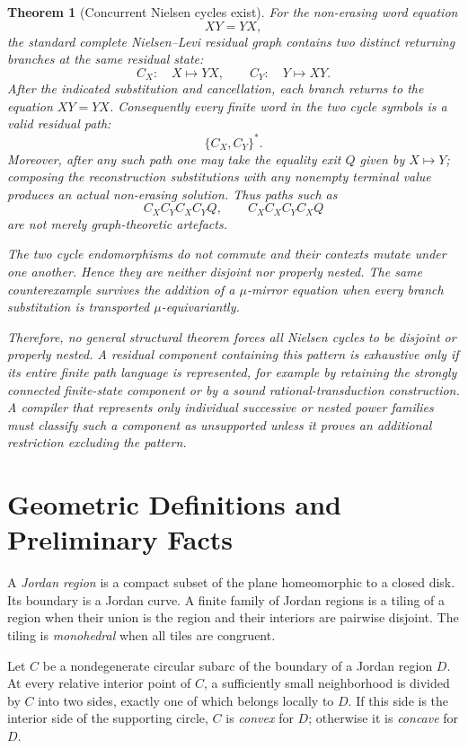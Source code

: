 \documentclass[11pt]{article}
\newtheorem{theorem}{Theorem}[section]
\begin{document}
\begin{theorem}[Concurrent Nielsen cycles exist]\label{thm:concurrent}
For the non-erasing word equation
\[
  XY=YX,
\]
the standard complete Nielsen--Levi residual graph contains two distinct returning branches at the same residual state:
\[
  C_X:\quad X\mapsto YX,
  \qquad
  C_Y:\quad Y\mapsto XY.
\]
After the indicated substitution and cancellation, each branch returns to the equation $XY=YX$. Consequently every finite word in the two cycle symbols is a valid residual path:
\[
  \{C_X,C_Y\}^*.
\]
Moreover, after any such path one may take the equality exit $Q$ given by $X\mapsto Y$; composing the reconstruction substitutions with any nonempty terminal value produces an actual non-erasing solution. Thus paths such as
\[
  C_XC_YC_XC_YQ,
  \qquad
  C_XC_XC_YC_XQ
\]
are not merely graph-theoretic artefacts.

The two cycle endomorphisms do not commute and their contexts mutate under one another. Hence they are neither disjoint nor properly nested. The same counterexample survives the addition of a $\mu$-mirror equation when every branch substitution is transported $\mu$-equivariantly.

Therefore, no general structural theorem forces all Nielsen cycles to be disjoint or properly nested. A residual component containing this pattern is exhaustive only if its entire finite path language is represented, for example by retaining the strongly connected finite-state component or by a sound rational-transduction construction. A compiler that represents only individual successive or nested power families must classify such a component as unsupported unless it proves an additional restriction excluding the pattern.
\end{theorem}

\clearpage
\section{Geometric Definitions and Preliminary Facts}

A \emph{Jordan region} is a compact subset of the plane homeomorphic to a closed disk. Its boundary is a Jordan curve. A finite family of Jordan regions is a tiling of a region when their union is the region and their interiors are pairwise disjoint. The tiling is \emph{monohedral} when all tiles are congruent.

Let $C$ be a nondegenerate circular subarc of the boundary of a Jordan region $D$. At every relative interior point of $C$, a sufficiently small neighborhood is divided by $C$ into two sides, exactly one of which belongs locally to $D$. If this side is the interior side of the supporting circle, $C$ is \emph{convex} for $D$; otherwise it is \emph{concave} for $D$.
\end{document}
